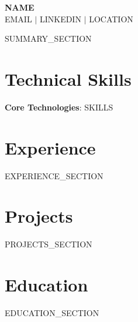 \documentclass[letterpaper,10pt]{article}
\newcommand{\resumeSubHeadingListStart}{\begin{itemize}[leftmargin=0.15in, label={}]}
\newcommand{\resumeSubHeadingListEnd}{\end{itemize}}
\begin{document}
\begin{center}
    \textbf{\Huge \scshape {{NAME}}} \\ \vspace{2pt}
    \small {{EMAIL}} $|$ {{LINKEDIN}} $|$ {{LOCATION}}
\end{center}

{{SUMMARY_SECTION}}

\section{Technical Skills}
 \begin{itemize}[leftmargin=0.15in, label={}]
    \small{\item{
     \textbf{Core Technologies}{: {{SKILLS}}}
    }}
 \end{itemize}

\section{Experience}
  \resumeSubHeadingListStart
{{EXPERIENCE_SECTION}}
  \resumeSubHeadingListEnd

\section{Projects}
    \resumeSubHeadingListStart
{{PROJECTS_SECTION}}
    \resumeSubHeadingListEnd

\section{Education}
  \resumeSubHeadingListStart
{{EDUCATION_SECTION}}
  \resumeSubHeadingListEnd

\end{document}
